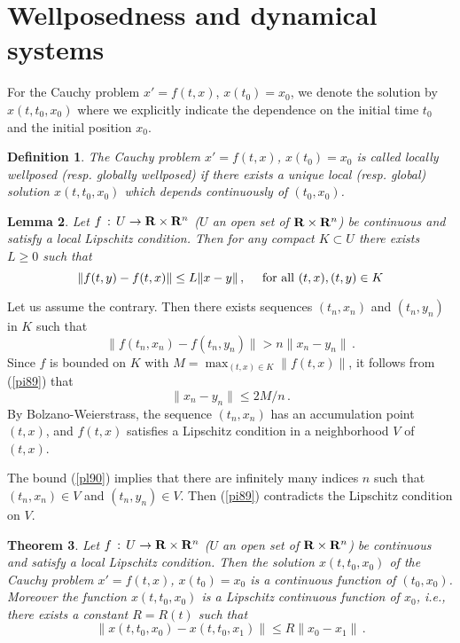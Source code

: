 \documentclass[12pt]{report}
\newcommand{\bR}{{\bf R}}
\newtheorem{theorem}{Theorem}[section]
\newtheorem{lemma}[theorem]{Lemma}
\newtheorem{definition}[theorem]{Definition}
\newcommand{\proof}{\noindent {\em Proof:~}}
\def\eqref#1{(\ref{#1})}
\def\qed{\hbox{\hskip 6pt\vrule width6pt height7pt depth1pt
    \hskip1pt}\bigskip}
\def\to{\rightarrow}
\begin{document}
\section{Wellposedness and dynamical systems}\label{wellposed}

For the Cauchy problem $x'=f(t,x)$, $x(t_0)=x_0$, we denote the
solution by $x(t, t_0, x_0)$ where we explicitly indicate the
dependence on the initial time $t_0$ and the initial position $x_0$.

\begin{definition}{\rm  
The Cauchy problem $x'=f(t,x)$, $x(t_0)=x_0$ is called {\em locally
wellposed} (resp. {\em globally wellposed}) if there exists a unique
local (resp. global) solution $x(t,t_0,x_0)$ which depends
continuously of $(t_0,x_0)$.  }
\end{definition}



\begin{lemma}\label{klip} Let $f\,:\, U \to \bR \times \bR^n$   
($U$ an open set of $\bR \times \bR^n$) be continuous and 
satisfy a local Lipschitz condition. Then for any
compact $K \subset U$ there exists $L\ge 0$ such that
\begin{equation}
\|f(t,y) - f(t,x)\| \le L \|x-y\| \,, \quad {\rm ~for~all~} (t,x), (t,y) 
\in K
\end{equation}
\end{lemma}

\proof Let us assume the contrary. Then there exists sequences $(t_n,
x_n)$ and $(t_n, y_n)$ in $K$  such that
\begin{equation}\label{pi89}
\|f(t_n,x_n) - f(t_n, y_n)\| > n \|x_n - y_n\|\,.
\end{equation}
Since $f$ is bounded on $K$ with $M = \max_{(t,x)\in K} \|f(t,x)\|$, it follows
from \eqref{pi89} that 
\begin{equation}\label{pl90}
\|x_n - y_n\| \le 2M/n \,.
\end{equation}
By Bolzano-Weierstrass, the sequence $(t_n,x_n)$ has an accumulation
point $(t,x)$, and  $f(t,x)$ satisfies a Lipschitz condition in a neighborhood 
$V$ of $(t,x)$.  

The bound \eqref{pl90} implies that there are infinitely many indices $n$ 
such that $(t_n, x_n)\in V$ and  $(t_n,y_n)\in V$.   Then \eqref{pi89} contradicts the 
Lipschitz condition on
$V$. \hfill \qed



\begin{theorem} \label{contdep}
Let $f\,:\, U \to \bR \times \bR^n$ ($U$ an open set of $\bR\times
\bR^n$) be continuous and satisfy a local Lipschitz condition. Then
the solution $x(t,t_0,x_0)$ of the Cauchy problem $x'=f(t,x)$,
$x(t_0)=x_0$ is a continuous function of $(t_0,x_0)$.   
Moreover the function $x(t,t_0,x_0)$ is a Lipschitz continuous function of 
$x_0$, i.e., there exists a constant $R=R(t)$ such that 
\begin{equation}\label{lipdep}
\|x(t,t_0,x_0)- x(t,t_0,x_1)\| \le R \| x_0 - x_1\| \,.
\end{equation}


\end{theorem}
\end{document}
